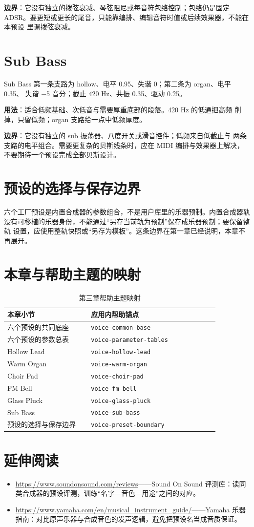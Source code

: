 \textbf{边界}：它没有独立的拨弦衰减、琴弦阻尼或每音符包络控制；包络仍是固定
ADSR。要更短或更长的尾音，只能靠编排、编辑音符时值或后续效果器，不能在本预设
里调拨弦衰减。

\section{Sub Bass}

Sub Bass 第一条支路为 hollow、电平 0.95、失谐 0；第二条为 organ、电平 0.35、
失谐 −5 音分；截止 420 Hz、共振 0.35、驱动 0.25。

\textbf{用法}：适合低频基础、次低音与需要厚重底部的段落。420 Hz 的低通把高频
削掉，只留低频；organ 支路给一点中低频厚度。

\textbf{边界}：它没有独立的 sub 振荡器、八度开关或滑音控件；低频来自低截止与
两条支路的电平组合。需要更复杂的贝斯线条时，应在 MIDI 编排与效果器上解决，
不要期待一个预设完成全部贝斯设计。

\section{预设的选择与保存边界}

六个工厂预设是内置合成器的参数组合，不是用户库里的乐器预制。内置合成器轨
没有可移植的乐器身份，不能通过“另存当前轨为预制”保存成乐器预制；要保留整轨
设置，应使用整轨快照或“另存为模板”。这条边界在第一章已经说明，本章不再展开。

\section{本章与帮助主题的映射}

\begin{table}[htbp]
\centering
\small
\begin{tabular}{@{}p{0.34\linewidth}p{0.52\linewidth}@{}}
\hline
本章小节 & 应用内帮助锚点 \\
\hline
六个预设的共同底座 & \texttt{voice-common-base} \\
六个预设的参数总表 & \texttt{voice-parameter-tables} \\
Hollow Lead & \texttt{voice-hollow-lead} \\
Warm Organ & \texttt{voice-warm-organ} \\
Choir Pad & \texttt{voice-choir-pad} \\
FM Bell & \texttt{voice-fm-bell} \\
Glass Pluck & \texttt{voice-glass-pluck} \\
Sub Bass & \texttt{voice-sub-bass} \\
预设的选择与保存边界 & \texttt{voice-preset-boundary} \\
\hline
\end{tabular}
\caption{第三章帮助主题映射}
\end{table}

\section*{延伸阅读}
\begin{itemize}[leftmargin=1.5em]
\item \url{https://www.soundonsound.com/reviews}——Sound On Sound 评测库：读同类合成器的预设评测，训练“名字—音色—用途”之间的对应。
\item \url{https://www.yamaha.com/en/musical_instrument_guide/}——Yamaha 乐器指南：对比原声乐器与合成音色的发声逻辑，避免把预设名当成音质保证。
\end{itemize}
